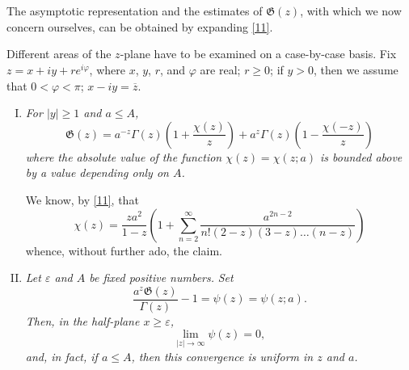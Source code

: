 \documentclass{article}
\newcommand{\GG}{\mathfrak{G}}
\renewcommand{\geq}{\geqslant}
\renewcommand{\leq}{\leqslant}
\newcommand{\oldpage}[1]{\marginpar{\phantom{.}\\\footnotesize$\Big\vert$ \textit{p.~#1}}}
\begin{document}
\section{}
\label{section2}

The asymptotic representation and the estimates of $\GG(z)$, with which we now concern ourselves, can be obtained by expanding \cref{11}.

\oldpage{309}
Different areas of the $z$-plane have to be examined on a case-by-case basis.
Fix $z = x+iy + re^{i\varphi}$, where $x$, $y$, $r$, and $\varphi$ are real; $r\geq0$; if $y>0$, then we assume that $0<\varphi<\pi$; $x-iy = \overline{z}$.

\begin{enumerate}[I.]
  \item \emph{For $|y|\geq1$ and $a\leq A$,}
    \[
    \label{17}
      \GG(z)
      = a^{-z} \Gamma(z) \left(
        1 + \frac{\chi(z)}{z}
      \right) + a^z \Gamma(z) \left(
        1 - \frac{\chi(-z)}{z}
      \right)
    \tag{17}
    \]
    \emph{where the absolute value of the function $\chi(z)=\chi(z;a)$ is bounded above by a value depending only on $A$.}
    \label{I}

    We know, by \cref{11}, that
    \[
      \chi(z)
      = \frac{za^2}{1-z} \left(
        1 + \sum_{n=2}^\infty \frac{a^{2n-2}}{n!(2-z)(3-z)\ldots(n-z)}
      \right)
    \]
    whence, without further ado, the claim.
  \item \emph{Let $\varepsilon$ and $A$ be fixed positive numbers.}
    \emph{Set}
    \[
    \label{18}
      \frac{a^z\GG(z)}{\Gamma(z)} - 1
      = \psi(z) = \psi(z;a).
    \tag{18}
    \]
    \emph{Then, in the half-plane $x\geq\varepsilon$,}
    \[
    \label{19}
      \lim_{|z|\to\infty} \psi(z) = 0,
    \tag{19}
    \]
    \emph{and, in fact, if $a\leq A$, then this convergence is uniform in $z$ and $a$.}
    \label{II}


\end{enumerate}
\end{document}
